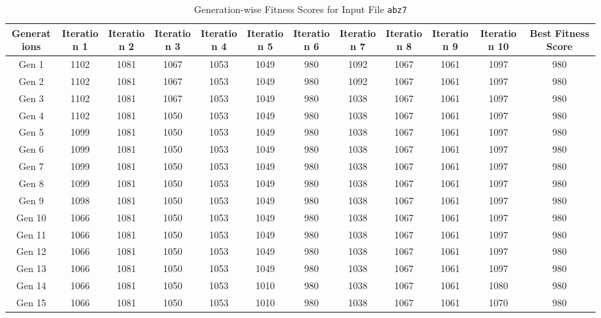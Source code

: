 \documentclass[12pt]{article}
\begin{document}
\begin{table}[h]
    \centering
    \caption{Generation-wise Fitness Scores for Input File \texttt{abz7}}
    \label{tab:fitness_scores_abz6}
    \begin{adjustbox}{max width=1\textwidth} %
        \begin{tabular}{*{12}{c}}
            \toprule
            Generations & Iteration 1 & Iteration 2 & Iteration 3 & Iteration 4 & Iteration 5 & Iteration 6 & Iteration 7 & Iteration 8 & Iteration 9 & Iteration 10 & Best Fitness Score \\
            \midrule
            Gen 1 & 1102 & 1081 & 1067 & 1053 & 1049 & 980 & 1092 & 1067 & 1061 & 1097 & 980 \\
            Gen 2 & 1102 & 1081 & 1067 & 1053 & 1049 & 980 & 1092 & 1067 & 1061 & 1097 & 980 \\
            Gen 3 & 1102 & 1081 & 1067 & 1053 & 1049 & 980 & 1038 & 1067 & 1061 & 1097 & 980 \\
            Gen 4 & 1102 & 1081 & 1050 & 1053 & 1049 & 980 & 1038 & 1067 & 1061 & 1097 & 980 \\
            Gen 5 & 1099 & 1081 & 1050 & 1053 & 1049 & 980 & 1038 & 1067 & 1061 & 1097 & 980 \\
            Gen 6 & 1099 & 1081 & 1050 & 1053 & 1049 & 980 & 1038 & 1067 & 1061 & 1097 & 980 \\
            Gen 7 & 1099 & 1081 & 1050 & 1053 & 1049 & 980 & 1038 & 1067 & 1061 & 1097 & 980 \\
            Gen 8 & 1099 & 1081 & 1050 & 1053 & 1049 & 980 & 1038 & 1067 & 1061 & 1097 & 980 \\
            Gen 9 & 1098 & 1081 & 1050 & 1053 & 1049 & 980 & 1038 & 1067 & 1061 & 1097 & 980 \\
            Gen 10 & 1066 & 1081 & 1050 & 1053 & 1049 & 980 & 1038 & 1067 & 1061 & 1097 & 980 \\
            Gen 11 & 1066 & 1081 & 1050 & 1053 & 1049 & 980 & 1038 & 1067 & 1061 & 1097 & 980 \\
            Gen 12 & 1066 & 1081 & 1050 & 1053 & 1049 & 980 & 1038 & 1067 & 1061 & 1097 & 980 \\
            Gen 13 & 1066 & 1081 & 1050 & 1053 & 1049 & 980 & 1038 & 1067 & 1061 & 1097 & 980 \\
            Gen 14 & 1066 & 1081 & 1050 & 1053 & 1010 & 980 & 1038 & 1067 & 1061 & 1080 & 980 \\
            Gen 15 & 1066 & 1081 & 1050 & 1053 & 1010 & 980 & 1038 & 1067 & 1061 & 1070 & 980 \\

\end{tabular}
\end{adjustbox}
\end{table}
\end{document}
